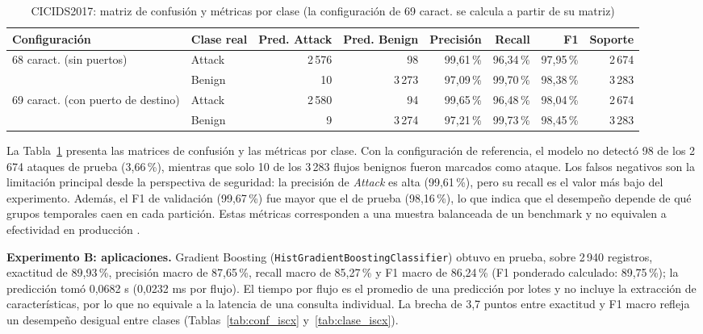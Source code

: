 \documentclass[conference]{IEEEtran}
\begin{document}
\begin{table}[!t]
\centering
\caption{CICIDS2017: matriz de confusión y métricas por clase (la configuración de 69 caract. se calcula a partir de su matriz)}
\label{tab:matriz_confusion_seguridad}
\small
\begin{tabular}{llrrrrrr}
\toprule
\textbf{Configuración} & \textbf{Clase real} & \textbf{Pred. Attack} & \textbf{Pred. Benign} & \textbf{Precisión} & \textbf{Recall} & \textbf{F1} & \textbf{Soporte} \\
\midrule
68 caract. (sin puertos) & Attack & 2\,576 & 98 & 99,61\,\% & 96,34\,\% & 97,95\,\% & 2\,674 \\
 & Benign & 10 & 3\,273 & 97,09\,\% & 99,70\,\% & 98,38\,\% & 3\,283 \\
69 caract. (con puerto de destino) & Attack & 2\,580 & 94 & 99,65\,\% & 96,48\,\% & 98,04\,\% & 2\,674 \\
 & Benign & 9 & 3\,274 & 97,21\,\% & 99,73\,\% & 98,45\,\% & 3\,283 \\
\bottomrule
\end{tabular}
\end{table}

La Tabla~\ref{tab:matriz_confusion_seguridad} presenta las matrices de confusión y las métricas por clase. Con la configuración de referencia, el modelo no detectó 98 de los 2\,674 ataques de prueba (3,66\,\%), mientras que solo 10 de los 3\,283 flujos benignos fueron marcados como ataque. Los falsos negativos son la limitación principal desde la perspectiva de seguridad: la precisión de \textit{Attack} es alta (99,61\,\%), pero su recall es el valor más bajo del experimento. Además, el F1 de validación (99,67\,\%) fue mayor que el de prueba (98,16\,\%), lo que indica que el desempeño depende de qué grupos temporales caen en cada partición. Estas métricas corresponden a una muestra balanceada de un benchmark y no equivalen a efectividad en producción \cite{apruzzese2023,engelen2021}.

\textbf{Experimento B: aplicaciones.} Gradient Boosting (\texttt{HistGradientBoostingClassifier}) obtuvo en prueba, sobre 2\,940 registros, exactitud de 89,93\,\%, precisión macro de 87,65\,\%, recall macro de 85,27\,\% y F1 macro de 86,24\,\% (F1 ponderado calculado: 89,75\,\%); la predicción tomó 0,0682 s (0,0232 ms por flujo). El tiempo por flujo es el promedio de una predicción por lotes y no incluye la extracción de características, por lo que no equivale a la latencia de una consulta individual. La brecha de 3,7 puntos entre exactitud y F1 macro refleja un desempeño desigual entre clases (Tablas~\ref{tab:conf_iscx} y~\ref{tab:clase_iscx}).
\end{document}
